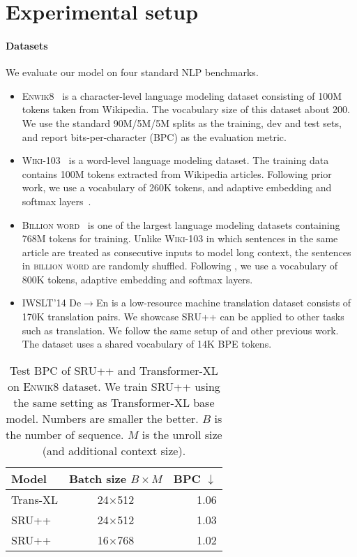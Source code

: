 
\section{Experimental setup}
\label{sec:setup}

\paragraph{Datasets}
We evaluate our model on four standard NLP benchmarks.
\begin{itemize}
    \item \textsc{Enwik8}~\cite{hutter2012human} is a character-level language modeling dataset consisting of 100M tokens taken from Wikipedia. 
    The vocabulary size of this dataset about 200.
    We use the standard 90M/5M/5M splits as the training, dev and test sets, and report bits-per-character (BPC) as the evaluation metric.
\item \textsc{Wiki-103}~\cite{merity2016pointer} is a word-level language modeling dataset. The training data contains 100M tokens extracted from Wikipedia articles. 
    Following prior work, we use a vocabulary of 260K tokens, and adaptive embedding and softmax layers~\cite{grave2017efficient,baevski2018adaptive}.
\item \textsc{Billion word}~\cite{billionword} is one of the largest language modeling datasets containing 768M tokens for training.
    Unlike \textsc{Wiki-103} in which sentences in the same article are treated as consecutive inputs to model long context, the sentences in \textsc{billion word} are randomly shuffled.
    Following \citet{baevski2018adaptive}, we use a vocabulary of 800K tokens, adaptive embedding and softmax layers. 
    \item \textsc{IWSLT}'14 De$\rightarrow$En is a low-resource machine translation dataset consists of 170K translation pairs.
    We showcase SRU++ can be applied to other tasks such as translation.
    We follow the same setup of \citet{lin-etal-2020-autoregressive} and other previous work.
    The dataset uses a shared vocabulary of 14K BPE tokens.
\end{itemize}

\begin{table}[t!]
    \centering
    \begin{tabular}{lcr}
        \toprule
\bf Model & \bf Batch size $B\times M$ & \bf BPC $\downarrow$ \\
        \hline
        Trans-XL & 24$\times$512 & 1.06 \\
        SRU++ &  24$\times$512 & 1.03 \\
        SRU++ &  16$\times$768 & 1.02 \\
        \bottomrule
    \end{tabular}
    \caption{Test BPC of SRU++ and Transformer-XL on \textsc{Enwik8} dataset. We train SRU++ using the same setting as Transformer-XL base model. 
Numbers are smaller the better.
    $B$ is the number of sequence. $M$ is the unroll size (and additional context size).}
    \label{tab:enwik8_base}
\end{table}

